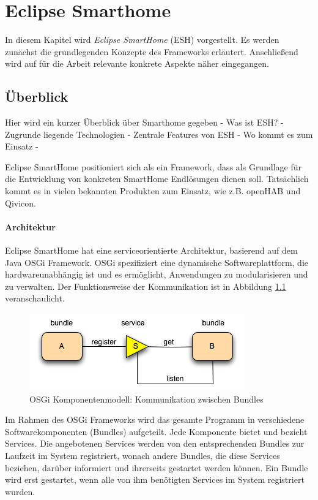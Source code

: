 \chapter{Eclipse Smarthome}
\label{chap:esh}
In diesem Kapitel wird \textit{Eclipse SmartHome} (ESH) \cite{ESH:home} vorgestellt. Es werden zunächst die grundlegenden Konzepte des Frameworks erläutert. Anschließend wird auf für die Arbeit relevante konkrete Aspekte näher eingegangen.

\section{Überblick}
Hier wird ein kurzer Überblick über Smarthome gegeben
- Was ist ESH?
- Zugrunde liegende Technologien
- Zentrale Features von ESH
- Wo kommt es zum Einsatz
-

Eclipse SmartHome positioniert sich als ein Framework, dass als Grundlage für die Entwicklung von konkreten SmartHome Endlösungen dienen soll. Tatsächlich kommt es in vielen bekannten Produkten zum Einsatz, wie z.B. openHAB und Qivicon. 


\subsubsection{Architektur}
Eclipse SmartHome hat eine serviceorientierte Architektur, basierend auf dem Java OSGi Framework. OSGi spezifiziert eine dynamische Softwareplattform, die hardwareunabhängig ist und es ermöglicht, Anwendungen zu modularisieren und zu verwalten. Der Funktionsweise der Kommunikation ist in Abbildung \ref{fig:osgi} veranschaulicht.

\begin{figure}[h]
	\centering
	\includegraphics{bilder/osgi}
	\caption{OSGi Komponentenmodell: Kommunikation zwischen Bundles \cite{osgi:whatisit}}
	\label{fig:osgi}
\end{figure}

Im Rahmen des OSGi Frameworks wird das gesamte Programm in verschiedene Softwarekomponenten (Bundles) aufgeteilt. Jede Komponente bietet und bezieht Services. Die angebotenen Services werden von den entsprechenden Bundles zur Laufzeit im System registriert, wonach andere Bundles, die diese Services beziehen, darüber informiert und ihrerseits gestartet werden können. Ein Bundle wird erst gestartet, wenn alle von ihm benötigten Services im System registriert wurden.\\

